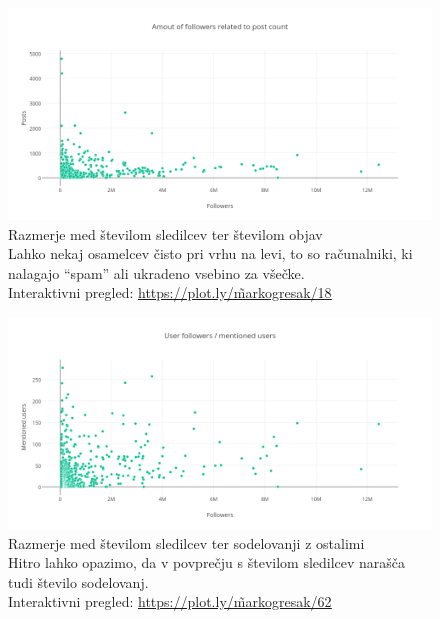 \documentclass[a4paper,11pt]{article}
\begin{document}
\begin{figure}[htbp]
  \begin{center}
    \includegraphics[width=\textwidth,height=\textheight,keepaspectratio]{figures/follower-posts.png}
    \caption{Razmerje med številom sledilcev ter številom objav\\
    Lahko nekaj osamelcev čisto pri vrhu na levi, to so računalniki, ki nalagajo ``spam'' ali ukradeno vsebino za všečke. \\
    Interaktivni pregled: \href{https://plot.ly/\~markogresak/18}{\underline{https://plot.ly/\~markogresak/18}}}
  \end{center}
\end{figure}

\begin{figure}[htbp]
  \begin{center}
    \includegraphics[width=\textwidth,height=\textheight,keepaspectratio]{figures/follower-cooperations.png}
    \caption{Razmerje med številom sledilcev ter sodelovanji z ostalimi\\
    Hitro lahko opazimo, da v povprečju s številom sledilcev narašča tudi število sodelovanj. \\
    Interaktivni pregled: \href{https://plot.ly/\~markogresak/62}{\underline{https://plot.ly/\~markogresak/62}}}
  \end{center}
\end{figure}
\end{document}
